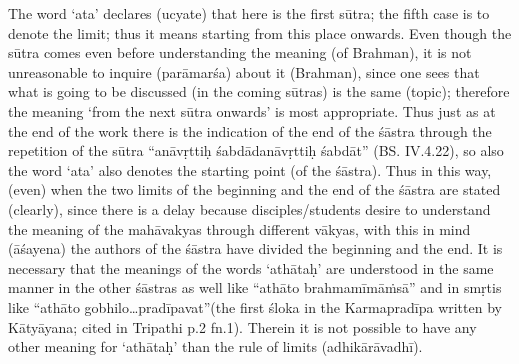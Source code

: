 The word ‘ata’ declares (ucyate) that here is the first sūtra; the fifth case is to denote the limit; thus it means starting from this place onwards. Even though the sūtra comes even before understanding the meaning (of  Brahman), it is not  unreasonable to inquire (parāmarśa) about it (Brahman), since one sees that what is going to be discussed (in the coming sūtras) is the same (topic); therefore the meaning ‘from the next sūtra onwards’ is most appropriate. Thus just as at the end of the work there is the indication of the end of the śāstra through the repetition of the sūtra “anāvṛttiḥ śabdādanāvṛttiḥ śabdāt” (BS. IV.4.22), so also the word ‘ata’ also denotes the starting point (of the śāstra). Thus in this way, (even) when the two limits of the beginning and the end of the śāstra are stated (clearly), since there is a delay because disciples/students desire to understand the meaning of the mahāvakyas through different vākyas, with this in mind (āśayena) the authors of the śāstra have divided the beginning and the end. It is necessary that the meanings of the words ‘athātaḥ’ are understood in the same manner in the other śāstras as well like “athāto brahmamīmāṁsā” and in smṛtis like “athāto gobhilo…pradīpavat”(the first śloka in the Karmapradīpa written by Kātyāyana; cited in Tripathi p.2 fn.1). Therein it is not possible to have any other meaning for ‘athātaḥ’ than the rule of limits (adhikārāvadhī).



